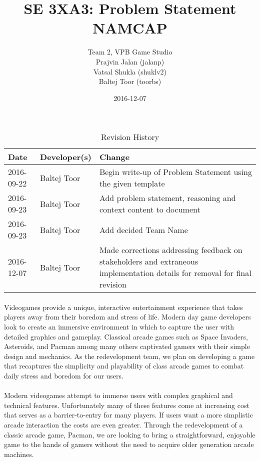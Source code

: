 \documentclass{article}
\title{SE 3XA3: Problem Statement\\NAMCAP}
\author{Team 2, VPB Game Studio
		\\ Prajvin Jalan (jalanp)
		\\ Vatsal Shukla (shuklv2)
		\\ Baltej Toor (toorbs)
}
\date{2016-12-07}
\begin{document}
\begin{table}[hp]
\caption{Revision History} \label{TblRevisionHistory}
\begin{tabularx}{\textwidth}{llX}
\toprule
\textbf{Date} & \textbf{Developer(s)} & \textbf{Change}\\
\midrule
2016-09-22 & Baltej Toor & Begin write-up of Problem Statement using the given
template\\
2016-09-23 & Baltej Toor & Add problem statement, reasoning and context content
to document\\
2016-09-23 & Baltej Toor & Add decided Team Name\\
2016-12-07 & Baltej Toor & Made corrections addressing feedback on stakeholders and extraneous implementation details for removal for final revision\\
\bottomrule
\end{tabularx}
\end{table}

\newpage

\maketitle

\paragraph{}
Videogames provide a unique, interactive entertainment experience that takes
players away from their boredom and stress of life. Modern day game developers
look to create an immersive environment in which to capture the user with
detailed graphics and gameplay. Classical arcade games such as Space Invaders,
Asteroids, and Pacman among many others captivated gamers with their simple
design and mechanics. As the redevelopment team, we plan on developing a game
that recaptures the simplicity and playability of class arcade games to combat
daily stress and boredom for our users.

\paragraph{}
Modern videogames attempt to immerse users with complex graphical and technical
features. Unfortunately many of these features come at increasing cost that
serves as a barrier-to-entry for many players. If users want a more simplistic
arcade interaction the costs are even greater. Through the redevelopment of a
classic arcade game, Pacman, we are looking to bring a straightforward,
enjoyable game to the hands of gamers without the need to acquire older
generation arcade machines.
\end{document}
